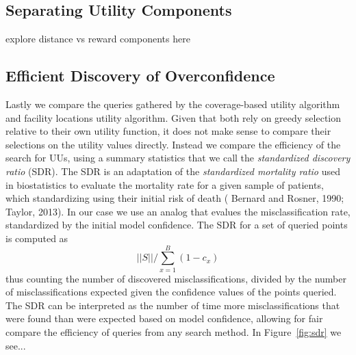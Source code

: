 \documentclass[letterpaper]{article} %
\newcommand{\km}[1]{{\color{red} #1}} %
\begin{document}
\subsection{Separating Utility Components}

\km{explore distance vs reward components here}



\subsection{Efficient Discovery of Overconfidence}

Lastly we compare the queries gathered by the coverage-based utility algorithm and facility locations utility algorithm. Given that both rely on greedy selection relative to their own utility function, it does not make sense to compare their selections on the utility values directly. Instead we compare the efficiency of the search for UUs, using a summary statistics that we call the \textit{standardized discovery ratio} (SDR). The SDR is an adaptation of the \textit{standardized mortality ratio} used in biostatistics to evaluate the mortality rate for a given sample of patients, which standardizing using their initial risk of death (\km{Bernard and Rosner, 1990; Taylor, 2013}). In our case we use an analog that evalues the misclassification rate, standardized by the initial model confidence. The SDR for a set of queried points is computed as
$$ ||S|| / \sum_{x=1}^B(1- c_x) $$
thus counting the number of discovered misclassifications, divided by the number of misclassifications expected given the confidence values of the points queried. The SDR can be interpreted as the number of time more misclassifications that were found than were expected based on model confidence, allowing for fair compare the efficiency of queries from any search method. \km{In Figure~\ref{fig:sdr} we see... }

\end{document}
